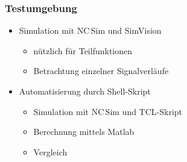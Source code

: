 \begin{frame}\frametitle{Testumgebung}
 \begin{itemize}
  \item Simulation mit NC\,Sim und SimVision
  \begin{itemize}
   \item nützlich für Teilfunktionen
   \item Betrachtung einzelner Signalverläufe
  \end{itemize}
  \item Automatisierung durch Shell-Skript
  \begin{itemize}
   \item Simulation mit NC\,Sim und TCL-Skript
   \item Berechnung mittels Matlab
   \item Vergleich
  \end{itemize}
 \end{itemize}
\end{frame}



